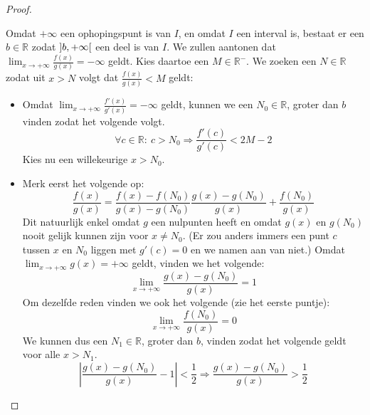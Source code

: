 \documentclass[main.tex]{subfiles}
\begin{document}
\begin{st}
\begin{proof}
\begin{itemize}
      Omdat $+\infty$ een ophopingspunt is van $I$, en omdat $I$ een interval is, bestaat er een $b\in \mathbb{R}$ zodat $\interval[open]{b}{+\infty}$ een deel is van $I$.
      We zullen aantonen dat $\lim_{x \rightarrow +\infty}\frac{f(x)}{g(x)} = -\infty$ geldt.
      Kies daartoe een $M \in \mathbb{R}^{-}$.
      We zoeken een $N\in \mathbb{R}$ zodat uit $x>N$ volgt dat $\frac{f(x)}{g(x)}<M$ geldt:
      \begin{itemize}
      \item Omdat $\lim_{x \rightarrow +\infty}\frac{f'(x)}{g'(x)} = -\infty$ geldt, kunnen we een $N_{0} \in \mathbb{R}$, groter dan $b$ vinden zodat het volgende volgt.
        \[ \forall c\in \mathbb{R}:\ c > N_{0} \Rightarrow \frac{f'(c)}{g'(c)} < 2M-2 \]
        Kies nu een willekeurige $x > N_{0}$.
        \begin{figure}[H]
          \centering
        \end{figure}
      \item 
        Merk eerst het volgende op:
        \[ \frac{f(x)}{g(x)} = \frac{f(x)-f(N_{0})}{g(x)-g(N_{0})}  \frac{g(x)-g(N_{0})}{g(x)} + \frac{f(N_{0})}{g(x)} \]
        Dit natuurlijk enkel omdat $g$ een nulpunten heeft en omdat $g(x)$ en $g(N_{0})$ nooit gelijk kunnen zijn voor $x \neq N_{0}$.
        (Er zou anders immers een punt $c$ tussen $x$ en $N_{0}$ liggen met $g'(c) =0$ en we namen aan van niet.)
        Omdat $\lim_{x\rightarrow +\infty}g(x) = +\infty$ geldt, vinden we het volgende:
        \[ \lim_{x\rightarrow +\infty}\frac{g(x)-g(N_{0})}{g(x)} = 1\]
        Om dezelfde reden vinden we ook het volgende (zie het eerste puntje):
        \[ \lim_{x\rightarrow +\infty}\frac{f(N_{0})}{g(x)} = 0 \]
        We kunnen dus een $N_{1}\in \mathbb{R}$, groter dan $b$, vinden zodat het volgende geldt voor alle $x>N_{1}$.
        \[ \left| \frac{g(x)-g(N_{0})}{g(x)} -1 \right| < \frac{1}{2}  \Rightarrow \frac{g(x)-g(N_{0})}{g(x)} > \frac{1}{2} \]

\end{itemize}
\end{itemize}
\end{proof}
\end{st}
\end{document}
